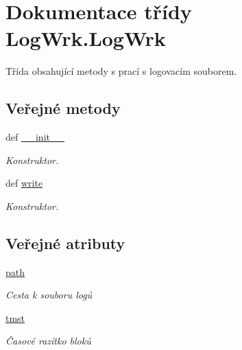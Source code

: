 \hypertarget{classLogWrk_1_1LogWrk}{\section{Dokumentace třídy Log\-Wrk.\-Log\-Wrk}
\label{d5/d2f/classLogWrk_1_1LogWrk}
}


Třída obsahující metody s prací s logovacím souborem.  


\subsection*{Veřejné metody}
\begin{DoxyCompactItemize}
\item 
def \hyperlink{classLogWrk_1_1LogWrk_a19fd0e1caa39a5a55cf5caab496481fe}{\-\_\-\-\_\-init\-\_\-\-\_\-}
\begin{DoxyCompactList}\small\item\em Konstruktor. \end{DoxyCompactList}\item 
def \hyperlink{classLogWrk_1_1LogWrk_ad3cc4159561b2cb00bd463b0e356e960}{write}
\begin{DoxyCompactList}\small\item\em Konstruktor. \end{DoxyCompactList}\end{DoxyCompactItemize}
\subsection*{Veřejné atributy}
\begin{DoxyCompactItemize}
\item 
\hypertarget{classLogWrk_1_1LogWrk_a1d465b6d28c5a9600a1b3f0bf7d69a9c}{\hyperlink{classLogWrk_1_1LogWrk_a1d465b6d28c5a9600a1b3f0bf7d69a9c}{path}}\label{d5/d2f/classLogWrk_1_1LogWrk_a1d465b6d28c5a9600a1b3f0bf7d69a9c}

\begin{DoxyCompactList}\small\item\em Cesta k souboru logů \end{DoxyCompactList}\item 
\hypertarget{classLogWrk_1_1LogWrk_a1114de33a634db2dc9db89f922608494}{\hyperlink{classLogWrk_1_1LogWrk_a1114de33a634db2dc9db89f922608494}{tmst}}\label{d5/d2f/classLogWrk_1_1LogWrk_a1114de33a634db2dc9db89f922608494}

\begin{DoxyCompactList}\small\item\em Časové razítko bloků \end{DoxyCompactList}\end{DoxyCompactItemize}


